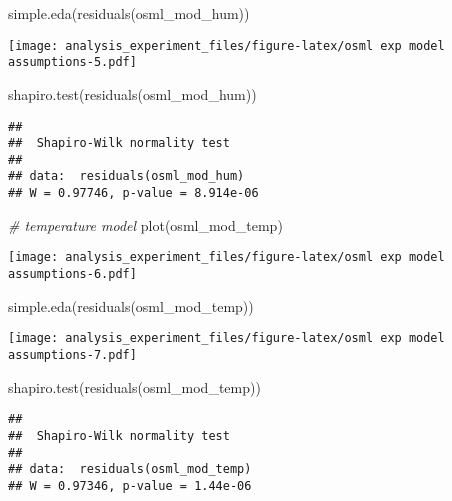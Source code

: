\documentclass[
]{article}
\newenvironment{Shaded}{\begin{snugshade}}{\end{snugshade}}
\newcommand{\CommentTok}[1]{\textcolor[rgb]{0.56,0.35,0.01}{\textit{#1}}}
\newcommand{\FunctionTok}[1]{\textcolor[rgb]{0.00,0.00,0.00}{#1}}
\newcommand{\NormalTok}[1]{#1}
\begin{document}
\begin{Shaded}
\begin{Highlighting}[]
\FunctionTok{simple.eda}\NormalTok{(}\FunctionTok{residuals}\NormalTok{(osml\_mod\_hum))}
\end{Highlighting}
\end{Shaded}

\texttt{[image: analysis\_experiment\_files/figure-latex/osml exp model assumptions-5.pdf]}

\begin{Shaded}
\begin{Highlighting}[]
\FunctionTok{shapiro.test}\NormalTok{(}\FunctionTok{residuals}\NormalTok{(osml\_mod\_hum))}
\end{Highlighting}
\end{Shaded}

\begin{verbatim}
## 
##  Shapiro-Wilk normality test
## 
## data:  residuals(osml_mod_hum)
## W = 0.97746, p-value = 8.914e-06
\end{verbatim}

\begin{Shaded}
\begin{Highlighting}[]
\CommentTok{\# temperature model}
\FunctionTok{plot}\NormalTok{(osml\_mod\_temp)}
\end{Highlighting}
\end{Shaded}

\texttt{[image: analysis\_experiment\_files/figure-latex/osml exp model assumptions-6.pdf]}

\begin{Shaded}
\begin{Highlighting}[]
\FunctionTok{simple.eda}\NormalTok{(}\FunctionTok{residuals}\NormalTok{(osml\_mod\_temp))}
\end{Highlighting}
\end{Shaded}

\texttt{[image: analysis\_experiment\_files/figure-latex/osml exp model assumptions-7.pdf]}

\begin{Shaded}
\begin{Highlighting}[]
\FunctionTok{shapiro.test}\NormalTok{(}\FunctionTok{residuals}\NormalTok{(osml\_mod\_temp))}
\end{Highlighting}
\end{Shaded}

\begin{verbatim}
## 
##  Shapiro-Wilk normality test
## 
## data:  residuals(osml_mod_temp)
## W = 0.97346, p-value = 1.44e-06
\end{verbatim}
\end{document}
